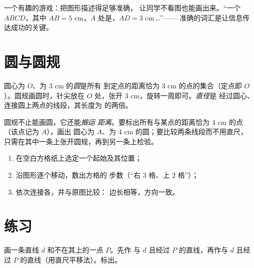 \begin{example}[描述多边形]\label{ex:g4:geometry:describe}
一个有趣的游戏：把图形描述得足够准确，
让同学不看图也能画出来。“一个 $ABCD$，其中
$AB = 5$ cm，$A$ 处是，$AD = 3$ cm\,\dots”——
准确的词汇是让信息传达成功的关键。
\end{example}

\section{圆与圆规}

\begin{definition}[圆]\label{def:g4:geometry:circle}
圆心为 $O$、为 $3$ cm 的\emph{圆}是所有
到定点的距离恰为 $3$ cm 的点的集合（定点即 $O$）。圆规画圆时，针尖放在
$O$ 处，张开 $3$ cm，旋转一周即可。\emph{直径}是
经过圆心、连接圆上两点的线段，其长度为
的两倍。
\end{definition}

\begin{example}[圆规：保持距离的工具]\label{ex:g4:geometry:compass}
圆规不止能画圆，它还能\emph{搬运
距离}。要标出所有与某点的距离恰为 $4$ cm 的点（该点记为 $A$），画出
圆心为 $A$、为 $4$ cm 的圆；要比较两条线段而不用直尺，
只需在其中一条上张开圆规，再到另一条上检验。
\end{example}

\begin{method}[在方格纸上复制图形]\label{met:g4:geometry:reproduce}
\begin{enumerate}
  \item 在空白方格纸上选定一个起始及其位置；
  \item 沿图形逐个移动，数出方格的
        步数（“右 $3$ 格、上 $2$ 格”）；
  \item 依次连接各，并与原图比较：
        边长相等，方向一致。
\end{enumerate}
\end{method}

\section{练习}

\begin{exercise}[$\star$]\label{exo:g4:geometry:1}
画一条直线 $d$ 和不在其上的一点 $P$。先作
与 $d$ 且经过 $P$ 的直线，再作与 $d$ 
且经过 $P$ 的直线（用直尺平移法）。标出。
\end{exercise}

